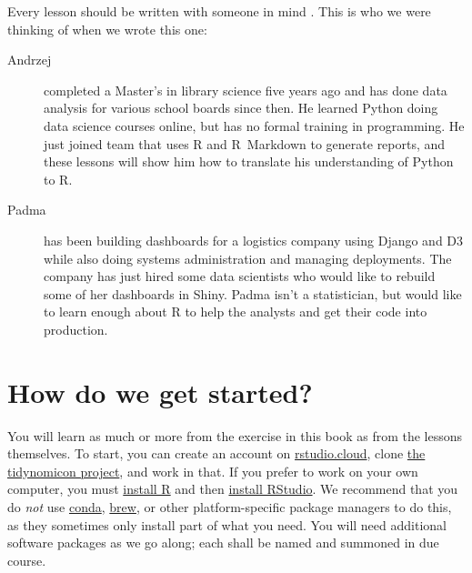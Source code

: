 Every lesson should be written with someone in mind \cite{Wils2019}.
This is who we were thinking of when we wrote this one:

\begin{description}

\item[Andrzej]
completed a Master's in library science five years ago
and has done data analysis for various school boards since then.
He learned Python doing data science courses online,
but has no formal training in programming.
He just joined team that uses R and R~Markdown to generate reports,
and these lessons will show him how to translate his understanding of Python to R.

\item[Padma]
has been building dashboards for a logistics company using Django and D3
while also doing systems administration and managing deployments.
The company has just hired some data scientists
who would like to rebuild some of her dashboards in Shiny.
Padma isn't a statistician,
but would like to learn enough about R to help the analysts
and get their code into production.

\end{description}

\section{How do we get started?}

You will learn as much or more from the exercise in this book as from the lessons themselves.
To start,
you can create an account on \href{https://rstudio.cloud/}{rstudio.cloud},
clone \href{https://github.com/gvwilson/r4py/}{the tidynomicon project},
and work in that.
If you prefer to work on your own computer,
you must \href{https://cran.rstudio.com/}{install R} and then \href{https://www.rstudio.com/products/rstudio/download/}{install RStudio}.
We recommend that you do \emph{not} use \href{https://conda.io/}{conda},
\href{https://brew.sh/}{brew},
or other platform-specific package managers to do this,
as they sometimes only install part of what you need.
You will need additional software packages as we go along;
each shall be named and summoned in due course.

